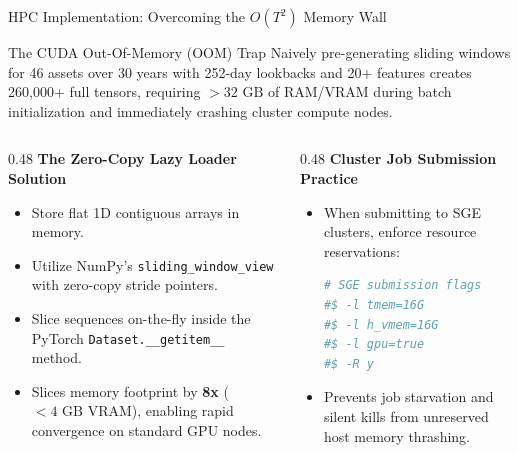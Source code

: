 \documentclass[10pt]{beamer}
\begin{document}
\begin{frame}[fragile]{HPC Implementation: Overcoming the $O(T^2)$ Memory Wall}
  \begin{alertblock}{The CUDA Out-Of-Memory (OOM) Trap}
    Naively pre-generating sliding windows for 46 assets over 30 years with 252-day lookbacks and 20+ features creates 260,000+ full tensors, requiring $>32\text{ GB}$ of RAM/VRAM during batch initialization and immediately crashing cluster compute nodes.
  \end{alertblock}
  \begin{columns}[t]
    \begin{column}{0.48\textwidth}
      \textbf{The Zero-Copy Lazy Loader Solution}
      \begin{itemize}\scriptsize
        \item Store flat 1D contiguous arrays in memory.
        \item Utilize NumPy's \texttt{sliding\_window\_view} with zero-copy stride pointers.
        \item Slice sequences on-the-fly inside the PyTorch \texttt{Dataset.\_\_getitem\_\_} method.
        \item Slices memory footprint by \textbf{8x} ($<4\text{ GB}$ VRAM), enabling rapid convergence on standard GPU nodes.
      \end{itemize}
    \end{column}
    \begin{column}{0.48\textwidth}
      \textbf{Cluster Job Submission Practice}
      \begin{itemize}\scriptsize
        \item When submitting to SGE clusters, enforce resource reservations:
        \begin{lstlisting}[language=bash]
# SGE submission flags
#$ -l tmem=16G
#$ -l h_vmem=16G
#$ -l gpu=true
#$ -R y
        \end{lstlisting}
        \item Prevents job starvation and silent kills from unreserved host memory thrashing.
      \end{itemize}
    \end{column}
  \end{columns}
\end{frame}
\end{document}
